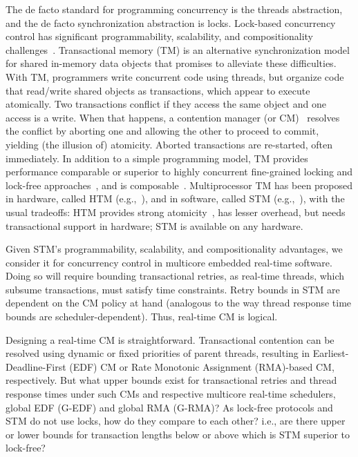 \documentclass{sig-alternate}
\begin{document}
The de facto standard for programming concurrency is the threads abstraction, and the de facto synchronization abstraction is locks. 
Lock-based concurrency control has significant programmability, scalability, and compositionality challenges~\cite{Herlihy:2006:AMP:1146381.1146382}. Transactional memory (TM) is an alternative synchronization model for shared in-memory data objects that promises to alleviate these difficulties.  With TM, programmers write concurrent code using threads, but organize code that read/write shared objects as transactions, which appear to execute atomically. Two transactions conflict if they access the same object and one access is a write. When that happens, a contention manager (or CM)~\cite{Guerraoui:2005:TTT:1073814.1073863} resolves the conflict by aborting one and allowing the other to proceed to commit, yielding (the illusion of) atomicity. Aborted transactions are re-started, often immediately.  In addition to a simple programming model, TM provides performance comparable or superior to highly concurrent fine-grained locking and lock-free approaches~\cite{Saha:2006:MHP:1122971.1123001}, and is composable~\cite{Harris:2005:CMT:1065944.1065952}. Multiprocessor TM has been proposed in hardware, called HTM (e.g.,~\cite{austenmc:tcc:dissertation:2009}), and in software, called STM (e.g.,~\cite{sha95}), with the usual tradeoffs: HTM provides strong atomicity~\cite{austenmc:tcc:dissertation:2009}, has lesser overhead, but needs transactional support in hardware; STM is available on any hardware.


Given STM's programmability, scalability, and compositionality advantages, we consider it for concurrency control in multicore embedded real-time software. Doing so will require bounding transactional  retries, as real-time threads, which subsume transactions, must satisfy time constraints.  Retry bounds in STM are dependent on the CM policy at hand (analogous to the way thread response time bounds are scheduler-dependent). Thus, real-time CM is logical.

Designing a real-time CM is straightforward. Transactional contention can be resolved using dynamic or fixed priorities of parent threads, resulting in Earliest-Deadline-First (EDF) CM or Rate Monotonic Assignment (RMA)-based CM, respectively. But what upper bounds exist for transactional retries and thread response times under such CMs and respective multicore real-time schedulers, global EDF (G-EDF) and global RMA (G-RMA)? As lock-free protocols and STM do not use locks, how do they compare to each other? i.e., are there upper or lower bounds for transaction lengths below or above which is STM superior to lock-free?
\end{document}
